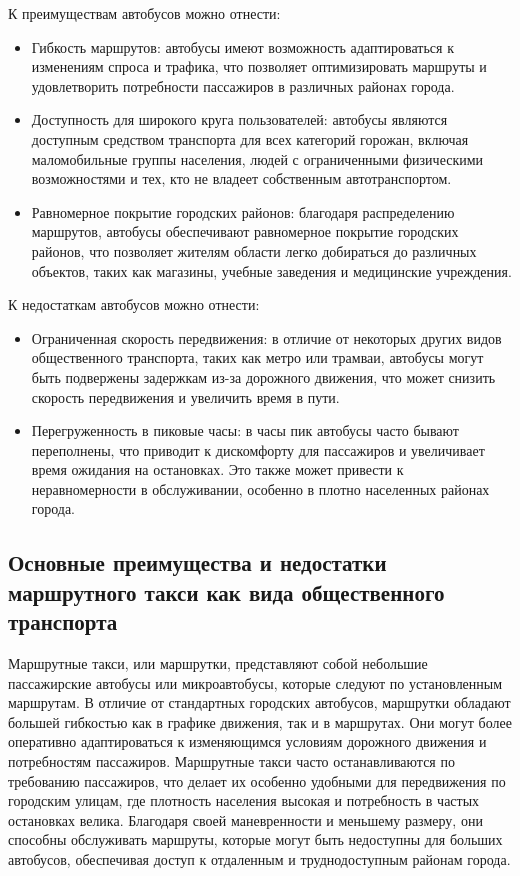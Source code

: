 К преимуществам автобусов можно отнести:
\begin{itemize}
	\item Гибкость маршрутов: автобусы имеют возможность адаптироваться к изменениям спроса и трафика, что позволяет оптимизировать маршруты и удовлетворить потребности пассажиров в различных районах города.
	\item Доступность для широкого круга пользователей: автобусы являются доступным средством транспорта для всех категорий горожан, включая маломобильные группы населения, людей с ограниченными физическими возможностями и тех, кто не владеет собственным автотранспортом.
	\item Равномерное покрытие городских районов: благодаря распределению маршрутов, автобусы обеспечивают равномерное покрытие городских районов, что позволяет жителям области легко добираться до различных объектов, таких как магазины, учебные заведения и медицинские учреждения.
\end{itemize}

К недостаткам автобусов можно отнести:
\begin{itemize}
	\item Ограниченная скорость передвижения: в отличие от некоторых других видов общественного транспорта, таких как метро или трамваи, автобусы могут быть подвержены задержкам из-за дорожного движения, что может снизить скорость передвижения и увеличить время в пути.
	\item Перегруженность в пиковые часы: в часы пик автобусы часто бывают переполнены, что приводит к дискомфорту для пассажиров и увеличивает время ожидания на остановках. Это также может привести к неравномерности в обслуживании, особенно в плотно населенных районах города.
\end{itemize}

\subsection{Основные преимущества и недостатки маршрутного такси как вида общественного транспорта}

Маршрутные такси, или маршрутки, представляют собой небольшие пассажирские автобусы или микроавтобусы, которые следуют по установленным маршрутам. В отличие от стандартных городских автобусов, маршрутки обладают большей гибкостью как в графике движения, так и в маршрутах. Они могут более оперативно адаптироваться к изменяющимся условиям дорожного движения и потребностям пассажиров. Маршрутные такси часто останавливаются по требованию пассажиров, что делает их особенно удобными для передвижения по городским улицам, где плотность населения высокая и потребность в частых остановках велика. Благодаря своей маневренности и меньшему размеру, они способны обслуживать маршруты, которые могут быть недоступны для больших автобусов, обеспечивая доступ к отдаленным и труднодоступным районам города. 

